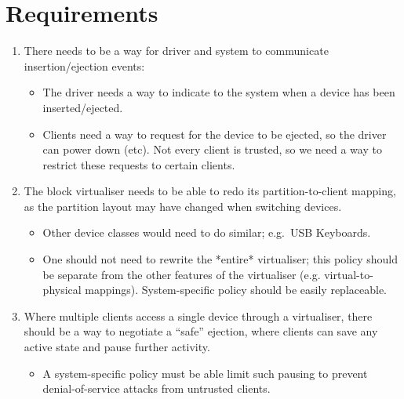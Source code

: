 \documentclass[a4paper,12pt]{report}
\begin{document}
\section{Requirements}

\begin{enumerate}
  \item There needs to be a way for driver and system to communicate
    insertion/ejection events:

        \begin{itemize}
          \item The driver needs a way to indicate to the system when a device has been inserted/ejected.

          \item Clients need a way to request for the device to be ejected, so the
                driver can power down (etc). Not every client is trusted, so we need
                a way to restrict these requests to certain clients.
        \end{itemize}

  \item The block virtualiser needs to be able to redo its partition-to-client
        mapping, as the partition layout may have changed when switching
        devices.

        \begin{itemize}
          \item Other device classes would need to do similar; e.g.~USB Keyboards.
          \item One should not need to rewrite the *entire* virtualiser; this
            policy should be separate from the other features of the virtualiser
            (e.g. virtual-to-physical mappings). System-specific policy should
            be easily replaceable.
        \end{itemize}

  \item Where multiple clients access a single device through a virtualiser,
        there should be a way to negotiate a ``safe'' ejection, where clients
        can save any active state and pause further activity.

        \begin{itemize}
          \item A system-specific policy must be able limit such
            pausing to prevent denial-of-service attacks from untrusted
            clients.
        \end{itemize}
\end{enumerate}
\end{document}
